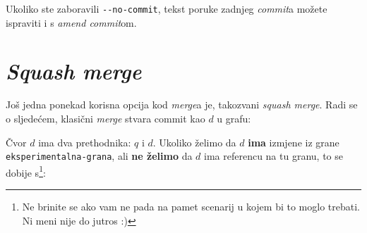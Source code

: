 Ukoliko ste zaboravili \verb+--no-commit+, tekst poruke zadnjeg \emph{commit}a možete ispraviti i s \emph{amend commit}om.

\section*{\emph{Squash merge}}

Još jedna ponekad korisna opcija kod \emph{merge}a je, takozvani \emph{squash merge}.
Radi se o sljedećem, klasični \emph{merge} stvara commit kao $d$ u grafu:



Čvor $d$ ima dva prethodnika: $q$ i $d$.
Ukoliko želimo da $d$ \textbf{ima} izmjene iz grane \verb+eksperimentalna-grana+, ali \textbf{ne želimo} da $d$ ima referencu na tu granu, to se dobije s\footnote{Ne brinite se ako vam ne pada na pamet scenarij u kojem bi to moglo trebati. Ni meni nije do jutros :)}:

